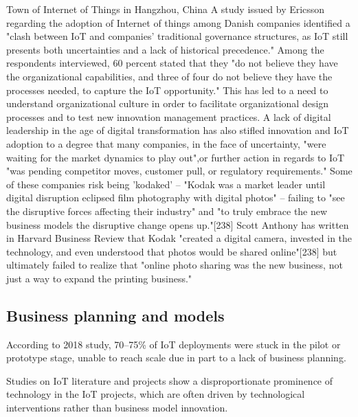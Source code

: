 \documentclass[12pt, a4paper, twoside]{article}
\begin{document}
Town of Internet of Things in Hangzhou, China
A study issued by Ericsson regarding the adoption of Internet of things among Danish companies identified a "clash between IoT and companies' traditional governance structures, as IoT still presents both uncertainties and a lack of historical precedence." Among the respondents interviewed, 60 percent stated that they "do not believe they have the organizational capabilities, and three of four do not believe they have the processes needed, to capture the IoT opportunity." This has led to a need to understand organizational culture in order to facilitate organizational design processes and to test new innovation management practices. A lack of digital leadership in the age of digital transformation has also stifled innovation and IoT adoption to a degree that many companies, in the face of uncertainty, "were waiting for the market dynamics to play out",or further action in regards to IoT "was pending competitor moves, customer pull, or regulatory requirements." Some of these companies risk being 'kodaked' – "Kodak was a market leader until digital disruption eclipsed film photography with digital photos" – failing to "see the disruptive forces affecting their industry" and "to truly embrace the new business models the disruptive change opens up."[238] Scott Anthony has written in Harvard Business Review that Kodak "created a digital camera, invested in the technology, and even understood that photos would be shared online"[238] but ultimately failed to realize that "online photo sharing was the new business, not just a way to expand the printing business."

\subsection{Business planning and models}
According to 2018 study, 70–75\% of IoT deployments were stuck in the pilot or prototype stage, unable to reach scale due in part to a lack of business planning.

Studies on IoT literature and projects show a disproportionate prominence of technology in the IoT projects, which are often driven by technological interventions rather than business model innovation.
\end{document}
